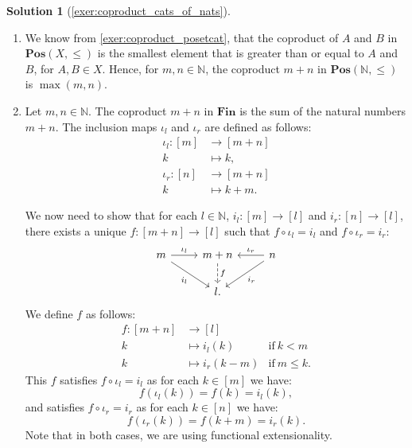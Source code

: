 \documentclass[a4paper,11pt, oneside,titlepage=false]{scrbook}
\theoremstyle{plain}
\theoremstyle{definition}
\newtheorem{solution}[thm]{Solution}
\newcommand{\Catb}[1]{\mathbf{#1}}
\newcommand{\POS}{\Catb{Pos}}
\newcommand{\SKELFINSET}{\Catb{Fin}}
\newcommand{\inl}{\ensuremath{\iota_l}}
\newcommand{\inr}{\ensuremath{\iota_r}}
\newcommand{\NN}{\ensuremath{\mathbb{N}}}
\begin{document}
\begin{solution}[\cref{exer:coproduct_cats_of_nats}]\label{sol:coproduct_cats_of_nats}
	\begin{enumerate}
		\item We know from \cref{exer:coproduct_posetcat}, that the coproduct of $A$ and $B$ in $\POS(X,\leq)$ is the smallest element that is greater than or equal to $A$ and $B$, for $A,B \in X$.
		Hence, for $m,n \in \NN$, the coproduct $m + n$ in $\POS(\NN,\leq)$ is $\max(m,n)$.
		\item Let $m,n \in \NN$. The coproduct $m + n$ in $\SKELFINSET$ is the sum of the natural numbers $m + n$. The inclusion maps $\iota_l$ and $\iota_r$ are defined as follows:
		\begin{align*}
			\iota_l : [m] &\to [m + n] \\
			k &\mapsto k, \\
			\iota_r : [n] &\to [m + n] \\
			k &\mapsto k + m.
		\end{align*}

		We now need to show that for each $l \in \NN$, $i_l : [m] \to [l]$ and $i_r : [n] \to [l]$, there exists a unique $f : [m + n] \to [l]$ such that $f \circ \iota_l = i_l$ and $f \circ \iota_r = i_r$:
		\[
			\begin{tikzcd}
			  m \ar[r, "\inl"] \ar[rd, "i_l"']
			  &
			  m + n  \ar[d, dashed, "f"]
			  &
			  n \ar[l, "\inr"'] \ar[ld, "i_r"]
			  \\
			  &
			  l.
			\end{tikzcd}
		\]
		We define $f$ as follows:
		\begin{align*}
			f : [m+n] & \to  [l] \\
			k & \mapsto i_l(k) & \mathrm{if~} k < m \\
			k & \mapsto i_r(k - m)  & \mathrm{if~} m \leq k.
		\end{align*}
		This $f$ satisfies $f \circ \iota_l = i_l$ as for each $k \in [m]$ we have:
		\[ f (\iota_l(k)) = f(k) = i_l(k),\]
		and satisfies $f \circ \iota_r =  i_r$ as for each $k \in [n]$ we have:
		\[ f(\iota_r (k)) = f(k + m) = i_r(k).\]
		Note that in both cases, we are using functional extensionality.


\end{enumerate}
\end{solution}
\end{document}
